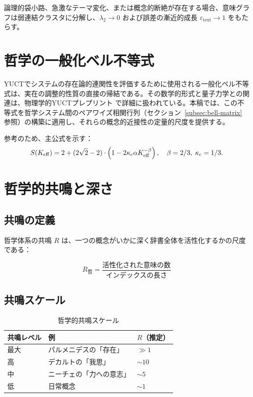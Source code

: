 \documentclass[11pt,a4paper]{article}
\newcommand{\kappac}{\kappa_c}
\newcommand{\betaf}{\beta}
\begin{document}
	論理的袋小路、急激なテーマ変化、または概念的断絶が存在する場合、意味グラフは弱連結クラスタに分解し、\(\lambda_2 \to 0\) および誤差の漸近的成長 \(\varepsilon_{\text{text}} \to 1\) をもたらす。
	
	\section{哲学の一般化ベル不等式}
	
	YUCTでシステムの存在論的連関性を評価するために使用される一般化ベル不等式は、実在の調整的性質の直接の帰結である。その数学的形式と量子力学との関連は、物理学的YUCTプレプリント \cite{Yakushev2026b} で詳細に扱われている。本稿では、この不等式を哲学システム間のペアワイズ相関行列（セクション~\ref{subsec:bell-matrix} 参照）の構築に適用し、それらの概念的近接性の定量的尺度を提供する。
	
	参考のため、主公式を示す：
	\[
	S(\Keff) = 2 + (2\sqrt{2} - 2) \cdot \left(1 - 2\kappac \alpha \Keff^{-\betaf}\right), \quad \betaf=2/3,\; \kappac=1/3.
	\]
	
	\section{哲学的共鳴と深さ}
	
	\subsection{共鳴の定義}
	
	哲学体系の共鳴 \(R\) は、一つの概念がいかに深く辞書全体を活性化するかの尺度である：
	
	\begin{equation}
		R_{\text{哲}} = \frac{\text{活性化された意味の数}}{\text{インデックスの長さ}}
	\end{equation}
	
	\subsection{共鳴スケール}
	
	\begin{table}[H]
		\centering
		\caption{哲学的共鳴スケール}
		\begin{tabular}{p{4cm}p{5cm}p{5cm}}
			\toprule
			\textbf{共鳴レベル} & \textbf{例} & \textbf{\(R\)（推定）} \\
			\midrule
			最大 & パルメニデスの「存在」 & \(\gg 1\) \\
			高 & デカルトの「我思」 & \(\sim 10\) \\
			中 & ニーチェの「力への意志」 & \(\sim 5\) \\
			低 & 日常概念 & \(\sim 1\) \\
			\bottomrule
		\end{tabular}
	\end{table}
	
\end{document}
